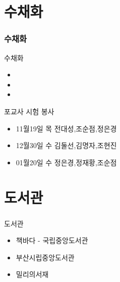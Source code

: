 \documentclass[aspectratio=1610,20pt,xcolor=pdftex,dvipsnames,table,handout]{beamer}
\begin{document}
		\section{수채화}
		\begin{frame} [t,plain]
		\frametitle{수채화}
			\begin{block} {수채화}
			\setlength{\leftmargini}{1em}			
			\begin{itemize}
				\item 	\hrulefill
				\item 	\hrulefill
				\item 	\hrulefill
			\end{itemize}
			\end{block}						



			\begin{block} {포교사 시험 봉사 }
			\setlength{\leftmargini}{1em}			
			\begin{itemize}
				\item 11월19일 목 전대성,조순점,정은경	\hrulefill
				\item 12월30일 수 김둘선,김명자,조현진	\hrulefill
				\item 01월20일 수 정은경,정재황,조순점 	\hrulefill
			\end{itemize}
			\end{block}						


		\end{frame}					

		\section{도서관}
		\begin{frame} [t,plain]
		\frametitle{}
			\begin{block} {도서관}
			\setlength{\leftmargini}{1em}			
			\begin{itemize}
				\item 책바다 - 국립중앙도서관
				\item 부산시립중앙도서관
				\item 밀리의서재 
			\end{itemize}
			\end{block}						
		\end{frame}					
\end{document}
